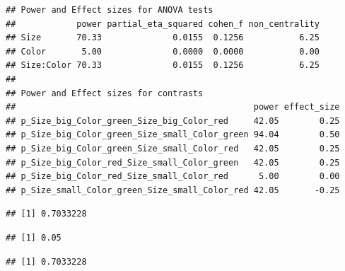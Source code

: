 \documentclass[]{book}
\newenvironment{Shaded}{\begin{snugshade}}{\end{snugshade}}
\newcommand{\CommentTok}[1]{\textcolor[rgb]{0.56,0.35,0.01}{\textit{#1}}}
\newcommand{\KeywordTok}[1]{\textcolor[rgb]{0.13,0.29,0.53}{\textbf{#1}}}
\newcommand{\NormalTok}[1]{#1}
\newcommand{\OperatorTok}[1]{\textcolor[rgb]{0.81,0.36,0.00}{\textbf{#1}}}
\newcommand{\StringTok}[1]{\textcolor[rgb]{0.31,0.60,0.02}{#1}}
\begin{document}
\begin{verbatim}
## Power and Effect sizes for ANOVA tests
##            power partial_eta_squared cohen_f non_centrality
## Size       70.33              0.0155  0.1256           6.25
## Color       5.00              0.0000  0.0000           0.00
## Size:Color 70.33              0.0155  0.1256           6.25
## 
## Power and Effect sizes for contrasts
##                                               power effect_size
## p_Size_big_Color_green_Size_big_Color_red     42.05        0.25
## p_Size_big_Color_green_Size_small_Color_green 94.04        0.50
## p_Size_big_Color_green_Size_small_Color_red   42.05        0.25
## p_Size_big_Color_red_Size_small_Color_green   42.05        0.25
## p_Size_big_Color_red_Size_small_Color_red      5.00        0.00
## p_Size_small_Color_green_Size_small_Color_red 42.05       -0.25
\end{verbatim}

\begin{Shaded}
\end{Shaded}

\begin{verbatim}
## [1] 0.7033228
\end{verbatim}

\begin{Shaded}
\end{Shaded}

\begin{verbatim}
## [1] 0.05
\end{verbatim}

\begin{Shaded}
\end{Shaded}

\begin{verbatim}
## [1] 0.7033228
\end{verbatim}
\end{document}
